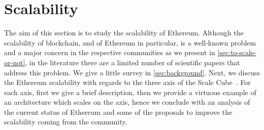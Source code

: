 \section{Scalability}
\label{sec:scalability}

The aim of this section is to study the scalability of Ethereum. Although the
scalability of blockchain, and of Ethereum in particular, is a well-known
problem and a major concern in the respective communities as we present in
\autoref{sec:to-scale-or-not}, in the literature there are a limited number of
scientific papers that address this problem. We give a little survey in
\autoref{sec:background}. Next, we discuss the Ethereum scalability with regards
to the three axis of the Scale Cube~\cite{bib:art-of-scalability}. For each
axis, first we give a brief description, then we provide a virtuous example of
an architecture which scales on the axis, hence we conclude with an analysis of
the current status of Ethereum and some of the proposals to improve the
scalability coming from the community.
